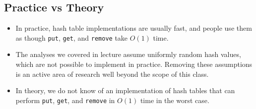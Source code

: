 \documentclass[12pt]{article}
\newcommand{\1}{\space \quad}
\newcommand{\2}{\quad \quad \quad}
\newcommand{\3}{\quad \quad \quad \quad \space}
\newcommand{\4}{\quad \quad \quad \quad \quad \quad}
\begin{document}
\subsection{Practice vs Theory}
\begin{itemize}
\item In practice, hash table implementations are usually fast, and people use them as though \texttt{put}, \texttt{get}, 
and \texttt{remove} take $O(1)$ time.
\item The analyses we covered in lecture assume uniformly random hash values, which are not possible to implement in 
practice. Removing these assumptions is an active area of research well beyond the scope of this class.
\item In theory, we do not know of an implementation of hash tables that can perform \texttt{put}, \texttt{get}, 
and \texttt{remove} in $O(1)$ time in the worst case.
\end{itemize}
\end{document}
